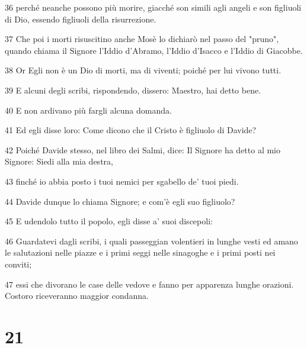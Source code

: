 \par 36 perché neanche possono più morire, giacché son simili agli angeli e son figliuoli di Dio, essendo figliuoli della risurrezione.
\par 37 Che poi i morti risuscitino anche Mosè lo dichiarò nel passo del "pruno", quando chiama il Signore l'Iddio d'Abramo, l'Iddio d'Isacco e l'Iddio di Giacobbe.
\par 38 Or Egli non è un Dio di morti, ma di viventi; poiché per lui vivono tutti.
\par 39 E alcuni degli scribi, rispondendo, dissero: Maestro, hai detto bene.
\par 40 E non ardivano più fargli alcuna domanda.
\par 41 Ed egli disse loro: Come dicono che il Cristo è figliuolo di Davide?
\par 42 Poiché Davide stesso, nel libro dei Salmi, dice: Il Signore ha detto al mio Signore: Siedi alla mia destra,
\par 43 finché io abbia posto i tuoi nemici per sgabello de' tuoi piedi.
\par 44 Davide dunque lo chiama Signore; e com'è egli suo figliuolo?
\par 45 E udendolo tutto il popolo, egli disse a' suoi discepoli:
\par 46 Guardatevi dagli scribi, i quali passeggian volentieri in lunghe vesti ed amano le salutazioni nelle piazze e i primi seggi nelle sinagoghe e i primi posti nei conviti;
\par 47 essi che divorano le case delle vedove e fanno per apparenza lunghe orazioni. Costoro riceveranno maggior condanna.

\chapter{21}

